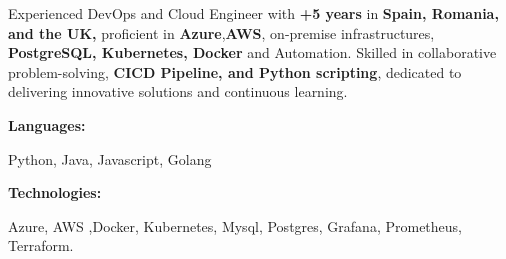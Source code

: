 \documentclass[9pt]{developercv} %
\begin{document}
\begin{minipage}[t]{0.46\textwidth}
    \vspace{-6pt}

    {Experienced DevOps and Cloud Engineer with \textbf{+5 years} in \textbf{Spain,
            Romania, and the UK,} proficient in \textbf{Azure},\textbf{AWS}, on-premise
        infrastructures, \textbf{PostgreSQL, Kubernetes, Docker} and Automation.
        Skilled in collaborative problem-solving, \textbf{CICD
            Pipeline, and Python scripting}, dedicated to delivering
        innovative solutions and continuous learning.}
\end{minipage}
\hfill %
\begin{minipage}[t]{0.465\textwidth}
    \vspace{-6pt}

    \begin{minipage}[t]{0.2\textwidth}
        \textbf{Languages:}
    \end{minipage}
    \hfill
    \begin{minipage}[t]{0.72\textwidth}
        Python, Java, Javascript, Golang
    \end{minipage}
    \vspace{4mm}

    \begin{minipage}[t]{0.2\textwidth}
        \textbf{Technologies:}
    \end{minipage}
    \hfill
    \begin{minipage}[t]{0.73\textwidth}
        Azure, AWS ,Docker, Kubernetes, Mysql, Postgres, Grafana, Prometheus, Terraform.
    \end{minipage}

\end{minipage}
\end{document}
